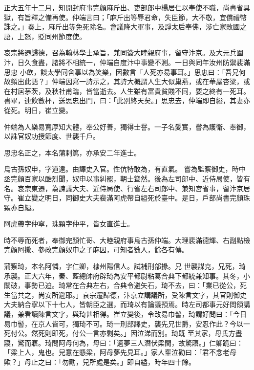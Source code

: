 \begin{pinyinscope}
 正大五年十二月，知開封府事完顏麻斤出、吏部郎中楊居仁以奉使不職，尚書省具獄，有旨釋之備再使。仲端言曰；「麻斤出等辱君命，失臣節，大不敬，宜償禮幣誅之。」奏上，麻斤出等免死除名。會議降大軍事，及諍太后奉佛，涉亡家敗國之語，上怒，貶同州節度使。



 哀宗將遷歸德，召為翰林學士承旨，兼同簽大睦親府事，留守汴京。及大元兵圍汴，日久食盡，諸將不相統一，仲端自度汴中事變不測。一日與同年汝州防禦裴滿思忠
 小飲，談太學同舍事以為笑樂，因數言「人死亦易事耳。」思忠曰：「吾兄何故頻出此語？」仲端因寫一詩示之，其詩大概謂人生大似巢燕，或在華屋杏梁，或在村居茅茨，及秋社甫臨，皆當逝去。人生雖有富貴貧賤不同，要之終有一死耳。書畢，連飲數杯，送思忠出門，曰：「此別終天矣。」思忠去，仲端即自縊，其妻亦從死。明日，崔立變。



 仲端為人樂易寬厚知大體，奉公好善，獨得士譽。一子名愛實，嘗為護衛、奉御，以誅官奴功授節度、世襲千戶。



 思忠名正之，本名蒲剌篤，亦承安二年進士。



 烏古孫奴申，字道遠。由譯史入官。性伉特敢為，有直氣。
 嘗為監察御史，時中丞完顏百家以酷烈聞，奴申以事糾罷，朝士聳然。後為左司郎中、近侍局使，皆有名。哀宗東遷，為諫議大夫、近侍局使、行省左右司郎中、兼知宮省事，留汴京居守。崔立變之明日，同御史大夫裴滿阿虎帶自縊死於臺中。是日，戶部尚書完顏珠顆亦自縊。



 阿虎帶字仲寧，珠顆字仲平，皆女直進士。



 時不辱而死者，奉御完顏忙哥、大睦親府事烏古孫仲端。大理裴滿德輝、右副點檢完顏阿撒、參政完顏奴申之子麻因，可知者數人，餘各有傳。



 蒲察琦，本名阿憐，字仁卿，棣州陽信人。試補刑部掾。兄
 世襲謀克，兄死，琦承襲。正大六年，秦、藍總帥府辟琦為安平都尉粘葛合典下都統兼知事。其冬，小關破，事勢已迫。琦常在合典左右，合典令避矢石，琦不去，曰：「業已從公，死生當共之，尚安所避耶。」哀宗遷歸德，汴京立講議所，受陳言文字，其官則御史大夫納合寧以下十七人，皆朝臣之選，而琦以有論議預焉。時左司都事元好問領講議，兼看讀陳言文字，與琦甚相得。崔立變後，令改易巾髻，琦謂好問曰：「今日易巾髻，在京人皆可，獨琦不可。琦一刑部譯史，襲先兄世爵，安忍作此？今以一死付公。然死則即死，付公一言亦剩矣。」因泣涕而別。琦既
 至其家，母氏方晝寢，驚而寤。琦問阿母何為，母曰：「適夢三人潛伏梁間，故驚寤。」仁卿跪曰：「梁上人，鬼也。兒意在懸梁，阿母夢先見耳。」家人輩泣勸曰：「君不念老母歟？」母止之曰：「勿勸，兒所處是矣。」即自縊，時年四十餘。




\end{pinyinscope}
